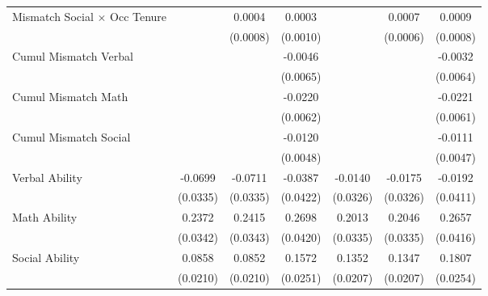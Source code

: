 {\begin{longtable}{l*{6}{c}}
Mismatch Social $\times$ Occ Tenure&                     &      0.0004         &      0.0003         &                     &      0.0007         &      0.0009         \\
                    &                     &    (0.0008)         &    (0.0010)         &                     &    (0.0006)         &    (0.0008)         \\
Cumul Mismatch Verbal&                     &                     &     -0.0046         &                     &                     &     -0.0032         \\
                    &                     &                     &    (0.0065)         &                     &                     &    (0.0064)         \\
Cumul Mismatch Math &                     &                     &     -0.0220\sym{***}&                     &                     &     -0.0221\sym{***}\\
                    &                     &                     &    (0.0062)         &                     &                     &    (0.0061)         \\
Cumul Mismatch Social&                     &                     &     -0.0120\sym{**} &                     &                     &     -0.0111\sym{**} \\
                    &                     &                     &    (0.0048)         &                     &                     &    (0.0047)         \\
Verbal Ability      &     -0.0699\sym{**} &     -0.0711\sym{**} &     -0.0387         &     -0.0140         &     -0.0175         &     -0.0192         \\
                    &    (0.0335)         &    (0.0335)         &    (0.0422)         &    (0.0326)         &    (0.0326)         &    (0.0411)         \\
Math Ability        &      0.2372\sym{***}&      0.2415\sym{***}&      0.2698\sym{***}&      0.2013\sym{***}&      0.2046\sym{***}&      0.2657\sym{***}\\
                    &    (0.0342)         &    (0.0343)         &    (0.0420)         &    (0.0335)         &    (0.0335)         &    (0.0416)         \\
Social Ability      &      0.0858\sym{***}&      0.0852\sym{***}&      0.1572\sym{***}&      0.1352\sym{***}&      0.1347\sym{***}&      0.1807\sym{***}\\
                    &    (0.0210)         &    (0.0210)         &    (0.0251)         &    (0.0207)         &    (0.0207)         &    (0.0254)         \\

\end{longtable}}
